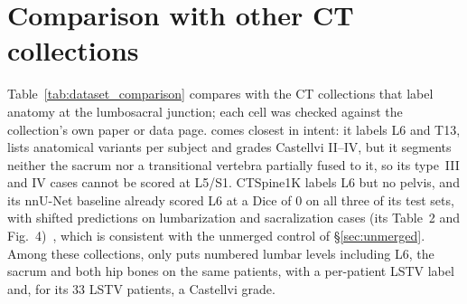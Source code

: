 %
\section{Comparison with other CT collections}
\label{app:comparison}

Table~\ref{tab:dataset_comparison} compares \dataset{} with the CT collections that label
anatomy at the lumbosacral junction; each cell was checked against the collection's own
paper or data page. \VerSe{} comes closest in intent: it labels L6 and T13, lists anatomical
variants per subject and grades Castellvi II--IV, but it segments neither the sacrum nor a
transitional vertebra partially fused to it, so its type~III and IV cases cannot be scored
at L5/S1. CTSpine1K labels L6 but no pelvis, and its nnU-Net baseline already scored L6 at
a Dice of 0 on all three of its test sets, with shifted predictions on lumbarization and
sacralization cases (its Table~2 and Fig.~4)~\citep{Deng2021CTSpine1K:Tomography}, which is
consistent with the unmerged control of \S\ref{sec:unmerged}. Among these collections, only
\dataset{} puts numbered lumbar levels including L6, the sacrum and both hip bones on the
same patients, with a per-patient LSTV label and, for its 33 LSTV patients, a Castellvi grade.

